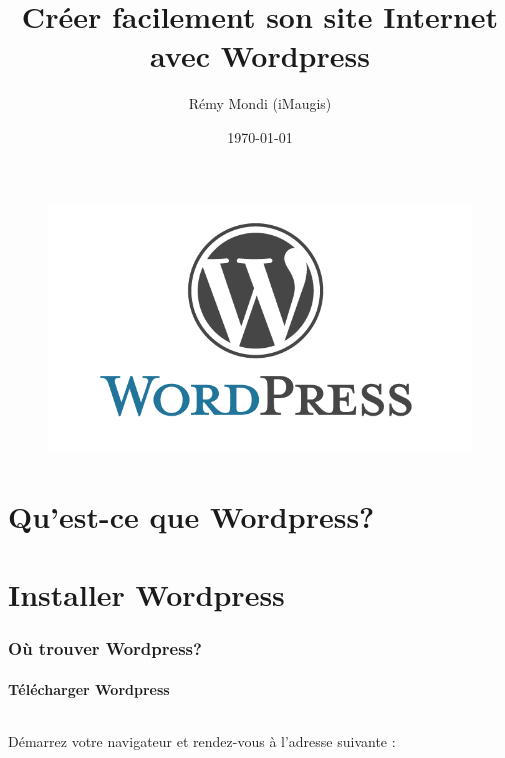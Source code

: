 \documentclass[10pt,a4paper]{article}
\title{Créer facilement son site Internet avec Wordpress}
\author{Rémy Mondi (iMaugis)}
\date{\today}
\begin{document}
\maketitle
\begin{figure}[!h]
\begin{center}
\includegraphics[scale=0.5]{img/logo-wordpress.png}
\end{center}
\end{figure}
\newpage

\tableofcontents
\newpage

\part*{Qu'est-ce que Wordpress?}
\newpage

\part{Installer Wordpress}
\newpage

\section{Où trouver Wordpress?}
\subsection{Télécharger Wordpress}
\paragraph{}Démarrez votre navigateur et rendez-vous à l'adresse suivante :
\end{document}
